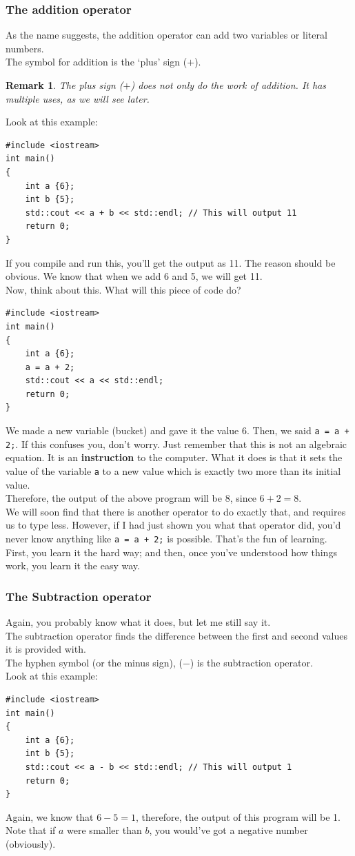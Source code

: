 \documentclass[letterpaper, 12pt]{book}
\newtheorem{remark}{Remark}
\begin{document}
\subsubsection{The addition operator}
As the name suggests, the addition operator can add two variables or literal numbers.\\
The symbol for addition is the `plus' sign ($+$).
\begin{remark}
	The plus sign ($+$) does not only do the work of addition. It has multiple uses, as we will see later.
\end{remark}
Look at this example:
\begin{lstlisting}
#include <iostream>
int main()
{
	int a {6};
	int b {5};
	std::cout << a + b << std::endl; // This will output 11
	return 0;
}
\end{lstlisting}
If you compile and run this, you'll get the output as 11. The reason should be obvious. We know that when we add 6 and 5, we will get 11.\\
Now, think about this. What will this piece of code do?
\begin{lstlisting}
#include <iostream>
int main()
{
	int a {6};
	a = a + 2;
	std::cout << a << std::endl;
	return 0;
}
\end{lstlisting}
We made a new variable (bucket) and gave it the value 6. Then, we said \lstinline{a = a + 2;}. If this confuses you, don't worry. Just remember that this is not an algebraic equation. It is an \textbf{instruction} to the computer. What it does is that it sets the value of the variable \lstinline{a} to a new value which is exactly two more than its initial value.\\
Therefore, the output of the above program will be $8$, since $6 + 2 = 8$.\\
We will soon find that there is another operator to do exactly that, and requires us to type less. However, if I had just shown you what that operator did, you'd never know anything like \lstinline{a = a + 2;} is possible. That's the fun of learning. First, you learn it the hard way; and then, once you've understood how things work, you learn it the easy way.
\subsubsection{The Subtraction operator}
Again, you probably know what it does, but let me still say it.\\
The subtraction operator finds the difference between the first and second values it is provided with.\\
The hyphen symbol (or the minus sign), ($-$) is the subtraction operator.\\
Look at this example:
\begin{lstlisting}
#include <iostream>
int main()
{
	int a {6};
	int b {5};
	std::cout << a - b << std::endl; // This will output 1
	return 0;
}
\end{lstlisting}
Again, we know that $6 - 5 = 1$, therefore, the output of this program will be 1. Note that if $a$ were smaller than $b$, you would've got a negative number (obviously).
\end{document}
